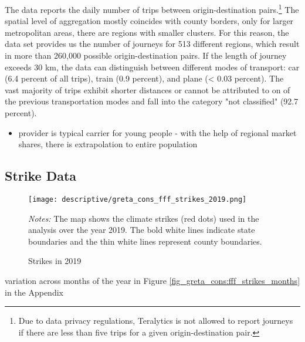 The data reports the daily number of trips between origin-destination pairs.\footnote{Due to data privacy regulations, Teralytics is not allowed to report journeys if there are less than five trips for a given origin-destination pair.} The spatial level of aggregation mostly coincides with county borders, only for larger metropolitan areas, there are regions with smaller clusters. For this reason, the data set provides us the number of journeys for 513 different regions, which result in more than 260,000 possible origin-destination pairs. If the length of journey exceeds 30 km, the data can distinguish between different modes of transport: car (6.4 percent of all trips), train (0.9 percent), and plane (< 0.03 percent). The vast majority of trips exhibit shorter distances or cannot be attributed to on of the previous transportation modes and fall into the category "not classified" (92.7 percent).






\begin{itemize}
	\item provider is typical carrier for young people - with the help of regional market shares, there is extrapolation to entire population
\end{itemize}














\subsection{Strike Data}

\begin{figure}[H]\centering
	\caption{Strikes in 2019}\label{fig_greta_cons:fff_strikes_2019}
	\texttt{[image: descriptive/greta\_cons\_fff\_strikes\_2019.png]}
	\begin{minipage}{0.8\linewidth}
		\scriptsize{\emph{Notes:} The map shows the climate strikes (red dots) used in the analysis over the year 2019. The bold white lines indicate state boundaries and the thin white lines represent county boundaries.}
	\end{minipage}
\end{figure}

variation across months of the year in Figure \ref{fig_greta_cons:fff_strikes_months} in the Appendix


